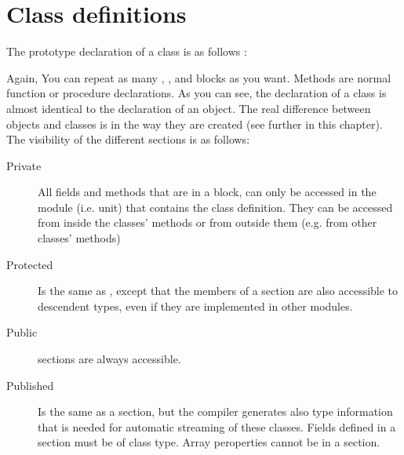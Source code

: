 \documentclass{report}
\begin{document}
\section{Class definitions}
The prototype declaration of a class is as follows :

Again, You can repeat as many , ,   
and  blocks as you want. 
Methods are normal function or procedure declarations. 
As you can see, the declaration of a class is almost identical to the
declaration of an object. The real difference between objects and classes
is in the way they are created (see further in this chapter).
The visibility of the different sections is as follows:
\begin{description}
\item [Private\ ] All fields and methods that are in a  block, can 
only be accessed in the module (i.e. unit) that contains the class definition.
They can be accessed from inside the classes' methods or from outside them
(e.g. from other classes' methods)
\item [Protected\ ] Is the same as , except that the members of
a  section are also accessible to descendent types, even if
they are implemented in other modules.
\item [Public\ ] sections are always accessible.
\item [Published\ ] Is the same as a  section, but the compiler
generates also type information that is needed for automatic streaming of
these classes. Fields defined in a  section must be of class type.
Array peroperties cannot be in a  section.
\end{description}
\end{document}
